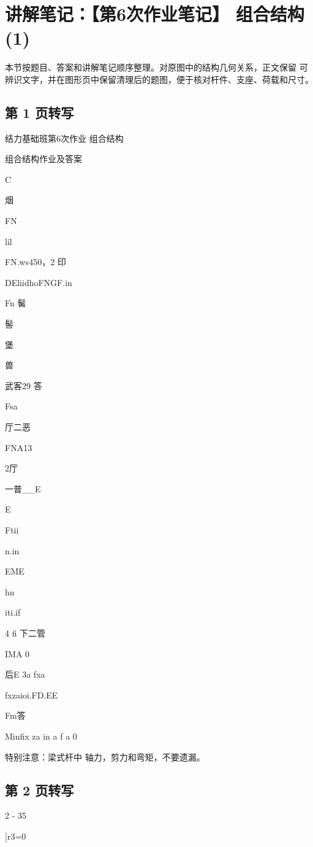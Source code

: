 \section{讲解笔记：【第6次作业笔记】 组合结构(1)}
\begin{analysisbox}
本节按题目、答案和讲解笔记顺序整理。对原图中的结构几何关系，正文保留 可辨识文字，并在图形页中保留清理后的题图，便于核对杆件、支座、荷载和尺寸。
\end{analysisbox}
\subsection*{第 1 页转写}
结力基础班第6次作业  组合结构

组合结构作业及答案

C

烟

 FN

lil

FN.ws450，2 印

DEliidhoFNGF.in

Fn 髺



髻

堡

兽

武客29 答

Fsa

厅二恶

FNA13

2厅

一普\_\_E

E

Ftii



n.in

EME

hn

iti.if

4 fi 下二管

IMA 0

后E 3a fxa

fxzaioi.FD.EE



Fm答

Minfix za in a f a 0

特别注意：梁式杆中 轴力，剪力和弯矩，不要遗漏。

\subsection*{第 2 页转写}
2 - 35

[r3=0

